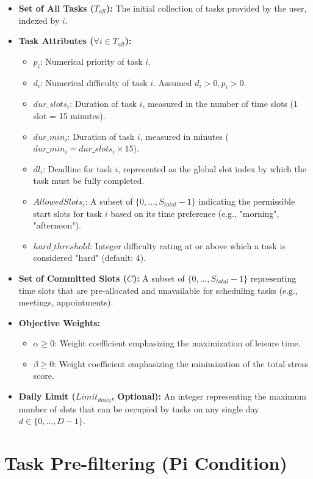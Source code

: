 \documentclass{article}
\begin{document}
\begin{itemize}
    \item \textbf{Set of All Tasks ($T_{all}$):} The initial collection of tasks provided by the user, indexed by $i$.
    \item \textbf{Task Attributes ($\forall i \in T_{all}$):}
    \begin{itemize}
        \item $p_i$: Numerical priority of task $i$.
        \item $d_i$: Numerical difficulty of task $i$. Assumed $d_i > 0, p_i > 0$.
        \item $dur\_slots_i$: Duration of task $i$, measured in the number of time slots (1 slot = 15 minutes).
        \item $dur\_min_i$: Duration of task $i$, measured in minutes ($dur\_min_i = dur\_slots_i \times 15$).
        \item $dl_i$: Deadline for task $i$, represented as the global slot index by which the task must be fully completed.
        \item $AllowedSlots_i$: A subset of $\{0, ..., S_{total}-1\}$ indicating the permissible start slots for task $i$ based on its time preference (e.g., "morning", "afternoon").
        \item $hard\_threshold$: Integer difficulty rating at or above which a task is considered "hard" (default: 4).
    \end{itemize}
    \item \textbf{Set of Committed Slots ($C$):} A subset of $\{0, ..., S_{total}-1\}$ representing time slots that are pre-allocated and unavailable for scheduling tasks (e.g., meetings, appointments).
    \item \textbf{Objective Weights:}
    \begin{itemize}
        \item $\alpha \ge 0$: Weight coefficient emphasizing the maximization of leisure time.
        \item $\beta \ge 0$: Weight coefficient emphasizing the minimization of the total stress score.
    \end{itemize}
    \item \textbf{Daily Limit ($Limit_{daily}$, Optional):} An integer representing the maximum number of slots that can be occupied by tasks on any single day $d \in \{0, ..., D-1\}$.
\end{itemize}

\section{Task Pre-filtering (Pi Condition)}
\end{document}
